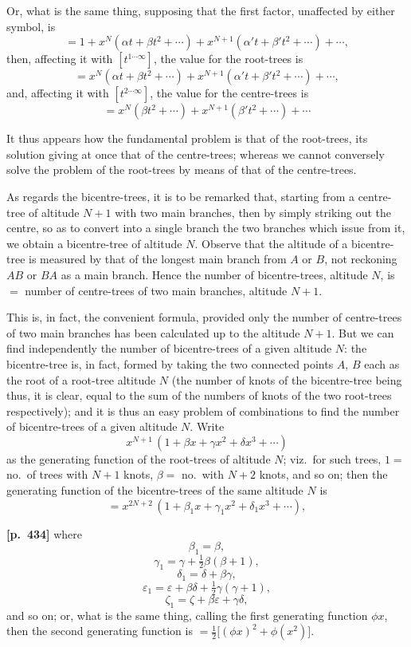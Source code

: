 \documentclass[11pt,a4paper]{article}
\begin{document}
Or, what is the same thing, supposing that the first factor, unaffected by either symbol, is
\[
= 1 + x^{N}(\alpha t + \beta t^{2} + \cdots) + x^{N+1}(\alpha' t + \beta' t^{2} + \cdots) + \cdots,
\]
then, affecting it with $[t^{1\cdots\infty}]$, the value for the root-trees is
\[
= x^{N}(\alpha t + \beta t^{2} + \cdots) + x^{N+1}(\alpha' t + \beta' t^{2} + \cdots) + \cdots,
\]
and, affecting it with $[t^{2\cdots\infty}]$, the value for the centre-trees is
\[
= x^{N}(\beta t^{2} + \cdots) + x^{N+1}(\beta' t^{2} + \cdots) + \cdots
\]

It thus appears how the fundamental problem is that of the root-trees, its solution giving at once that of the centre-trees; whereas we cannot conversely solve the problem of the root-trees by means of that of the centre-trees.

As regards the bicentre-trees, it is to be remarked that, starting from a centre-tree of altitude $N+1$ with two main branches, then by simply striking out the centre, so as to convert into a single branch the two branches which issue from it, we obtain a bicentre-tree of altitude $N$. Observe that the altitude of a bicentre-tree is measured by that of the longest main branch from $A$ or $B$, not reckoning $AB$ or $BA$ as a main branch. Hence the number of bicentre-trees, altitude $N$, is $=$ number of centre-trees of two main branches, altitude $N+1$.

This is, in fact, the convenient formula, provided only the number of centre-trees of two main branches has been calculated up to the altitude $N+1$. But we can find independently the number of bicentre-trees of a given altitude $N$: the bicentre-tree is, in fact, formed by taking the two connected points $A,\,B$ each as the root of a root-tree altitude $N$ (the number of knots of the bicentre-tree being thus, it is clear, equal to the sum of the numbers of knots of the two root-trees respectively); and it is thus an easy problem of combinations to find the number of bicentre-trees of a given altitude $N$. Write
\[
x^{N+1}\,(1 + \beta x + \gamma x^{2} + \delta x^{3} + \cdots)
\]
as the generating function of the root-trees of altitude $N$; viz.\ for such trees, $1=$ no.\ of trees with $N+1$ knots, $\beta=$ no.\ with $N+2$ knots, and so on; then the generating function of the bicentre-trees of the same altitude $N$ is
\[
= x^{2N+2}\,(1 + \beta_{1} x + \gamma_{1} x^{2} + \delta_{1} x^{3} + \cdots),
\]

\bigskip
\noindent\textbf{[p.~434]}\quad
where
\[
\beta_{1} = \beta,
\]
\[
\gamma_{1} = \gamma + \tfrac{1}{2}\beta(\beta+1),
\]
\[
\delta_{1} = \delta + \beta\gamma,
\]
\[
\varepsilon_{1} = \varepsilon + \beta\delta + \tfrac{1}{2}\gamma(\gamma+1),
\]
\[
\zeta_{1} = \zeta + \beta\varepsilon + \gamma\delta,
\]
and so on; or, what is the same thing, calling the first generating function $\phi x$, then the second generating function is $=\tfrac{1}{2}\bigl[(\phi x)^{2} + \phi(x^{2})\bigr]$.
\end{document}
